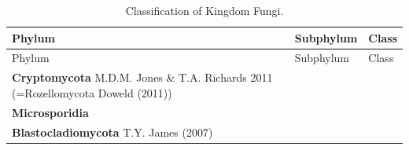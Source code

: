 \documentclass[]{book}
\begin{document}
\begin{longtable}[]{@{}lll@{}}
\caption{\label{tab:fungal-class} Classification of Kingdom
Fungi.}\tabularnewline
\toprule
\begin{minipage}[b]{0.32\columnwidth}\raggedright\strut
Phylum\strut
\end{minipage} & \begin{minipage}[b]{0.28\columnwidth}\raggedright\strut
Subphylum\strut
\end{minipage} & \begin{minipage}[b]{0.31\columnwidth}\raggedright\strut
Class\strut
\end{minipage}\tabularnewline
\midrule
\endfirsthead
\toprule
\begin{minipage}[b]{0.32\columnwidth}\raggedright\strut
Phylum\strut
\end{minipage} & \begin{minipage}[b]{0.28\columnwidth}\raggedright\strut
Subphylum\strut
\end{minipage} & \begin{minipage}[b]{0.31\columnwidth}\raggedright\strut
Class\strut
\end{minipage}\tabularnewline
\midrule
\endhead
\begin{minipage}[t]{0.32\columnwidth}\raggedright\strut
\textbf{Cryptomycota} M.D.M. Jones \& T.A. Richards 2011 (=Rozellomycota
Doweld (2011))\strut
\end{minipage} & \begin{minipage}[t]{0.28\columnwidth}\raggedright\strut
\strut
\end{minipage} & \begin{minipage}[t]{0.31\columnwidth}\raggedright\strut
\strut
\end{minipage}\tabularnewline
\begin{minipage}[t]{0.32\columnwidth}\raggedright\strut
\textbf{Microsporidia }\strut
\end{minipage} & \begin{minipage}[t]{0.28\columnwidth}\raggedright\strut
\strut
\end{minipage} & \begin{minipage}[t]{0.31\columnwidth}\raggedright\strut
\strut
\end{minipage}\tabularnewline
\begin{minipage}[t]{0.32\columnwidth}\raggedright\strut
\textbf{Blastocladiomycota} T.Y. James (2007)\strut
\end{minipage} & \begin{minipage}[t]{0.28\columnwidth}\raggedright\strut

\end{minipage}
\end{longtable}
\end{document}
